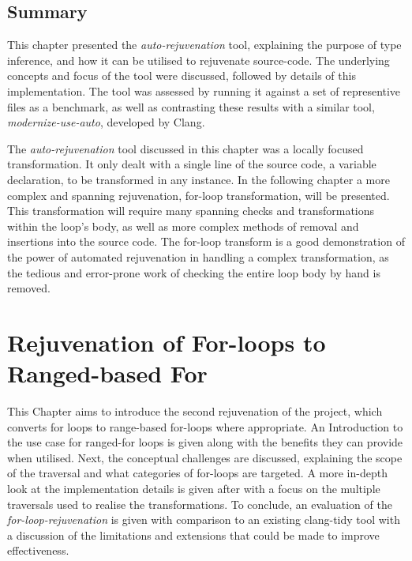\documentclass[bsc,frontabs,singlespacing,twoside,parskip,deptreport]{infthesis}
\begin{document}

\section{Summary}%

This chapter presented the \textit{auto-rejuvenation} tool, explaining the purpose of type inference, and how it can be utilised to rejuvenate source-code. The underlying concepts and focus of the tool were discussed, followed by details of this implementation. The tool was assessed by running it against a set of representive files as a benchmark, as well as contrasting these results with a similar tool, \textit{modernize-use-auto}, developed by Clang. 

The \textit{auto-rejuvenation} tool discussed in this chapter was a locally focused transformation. It only dealt with a single line of the source code, a variable declaration, to be transformed in any instance. In the following chapter a more complex and spanning rejuvenation, for-loop transformation, will be presented. This transformation will require many spanning checks and transformations within the loop's body, as well as more complex methods of removal and insertions into the source code. The for-loop transform is a good demonstration of the power of automated rejuvenation in handling a complex transformation, as the tedious and error-prone work of checking the entire loop body by hand is removed.


\chapter{Rejuvenation of For-loops to Ranged-based For}\label{chp:loop-transform}

This Chapter aims to introduce the second rejuvenation of the project, which converts for loops to range-based for-loops where appropriate. An Introduction to the use case for ranged-for loops is given along with the benefits they can provide when utilised. Next, the conceptual challenges are discussed, explaining the scope of the traversal and what categories of for-loops are targeted. A more in-depth look at the implementation details is given after with a focus on the multiple traversals used to realise the transformations. To conclude, an evaluation of the \textit{ for-loop-rejuvenation} is given with comparison to an existing clang-tidy tool with a discussion of the limitations and extensions that could be made to improve effectiveness.
\end{document}
